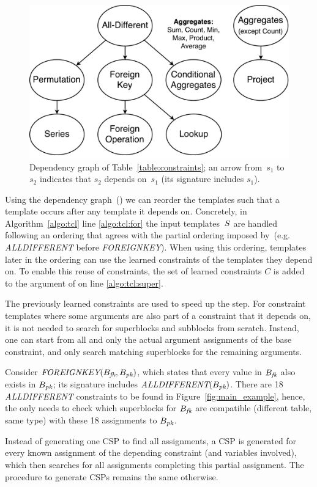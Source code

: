 \begin{figure}[t]
  \centering
  \includegraphics[width=0.50\linewidth]{figures/constraint_dependency2.pdf}
  \caption{Dependency graph of Table~\ref{table:constraints}; an arrow from~$s_1$ to~$s_2$ indicates that $s_2$ depends on~$s_1$ (its signature includes $s_1$).
  }
  \label{fig:learning_order}
\end{figure}

Using the dependency graph~(\dependencies) we can reorder the templates such that a template occurs after any template it depends on.
Concretely, in Algorithm~\ref{algo:tcl} line \ref{algo:tcl:for} the input templates~$S$ are handled following an ordering that agrees with the partial ordering imposed by~\dependencies (e.g. \textit{ALLDIFFERENT} before \textit{FOREIGNKEY}).
When using this ordering, templates later in the ordering can use the learned constraints of the templates they depend on.
To enable this reuse of constraints, the set of learned constraints $C$ is added to the argument of \generategroups on line \ref{algo:tcl:super}.

The previously learned constraints are used to speed up the \generategroups step. For constraint templates where some arguments are also part of a constraint that it depends on, it is not needed to search for superblocks and subblocks from scratch. Instead, one can start from all and only the actual argument assignments of the base constraint, and only search matching superblocks for the remaining arguments.

\begin{example}
  Consider $\textit{FOREIGNKEY}(B_{\textit{fk}},B_{\textit{pk}})$, which states that every value in $B_{\textit{fk}}$ also exists in $B_{\textit{pk}}$; its signature includes $\textit{ALLDIFFERENT}(B_{\textit{pk}})$. There are 18 \textit{ALLDIFFERENT} constraints to be found in Figure~\ref{fig:main_example}, hence, the \generategroups only needs to check which superblocks for $B_{\textit{fk}}$ are compatible (different table, same type) with these 18 assignments to $B_{\textit{pk}}$.
\end{example}

Instead of generating one CSP to find all assignments, a CSP is generated for every known assignment of the depending constraint (and variables involved), which then searches for all assignments completing this partial assignment.
The procedure to generate CSPs remains the same otherwise.





